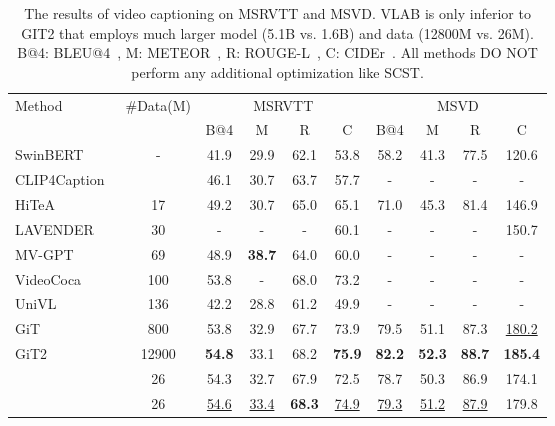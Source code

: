 \documentclass{article}
\begin{document}
\begin{table*}[]
\small
\centering
\caption{The results of video captioning on MSRVTT and MSVD. VLAB is only inferior to GIT2 that employs much larger model (5.1B vs. 1.6B) and data (12800M vs. 26M). B@4: BLEU@4~\cite{papineni2002bleu}, M: METEOR~\cite{banerjee2005meteor}, R: ROUGE-L~\cite{lin2004rouge}, C: CIDEr~\cite{vedantam2015cider}.  All methods DO NOT perform any additional optimization like SCST.}
\begin{tabular}{l|c|cccc|cccc}
\toprule
\multirow{2}{*}{Method} & \multirow{2}{*}{\#Data(M)}  & \multicolumn{4}{c|}{MSRVTT}     & \multicolumn{4}{c}{MSVD} \\ \cmidrule(lr){3-10} 
                                                          &                    & B@4 & M & R & C & B@4 & M & R & C         \\ 
    \midrule
    SwinBERT~\cite{lin2022swinbert} & -        &41.9   &29.9   &62.1   &53.8   &58.2 &41.3 &77.5 &120.6 \\
    CLIP4Caption~\cite{tang2021clip4caption}  & &46.1 &30.7   &63.7   &57.7   &-  &-  &-  &-  \\
    HiTeA~\cite{ye2022hitea}       &17       &49.2   &30.7   &65.0   &65.1   &71.0   &45.3   &81.4   &146.9\\
    LAVENDER~\cite{li2022lavender}  &30     &-   &- &-   & 60.1  &-  &-  &- &150.7 \\  
    MV-GPT~\cite{seo2022end}        &69      &48.9   &\textbf{38.7}   &64.0   &60.0   &-  &-  &-  &-\\
    VideoCoca~\cite{yan2022video}     &100   &53.8 &- &68.0 &73.2 &- &- &- &- \\
    UniVL~\cite{luo2020univl}       &136     &42.2   &28.8   &61.2   &49.9   &-  &-  &-  &-\\
    GiT~\cite{wang2022git}          &800   & 53.8 & 32.9 & 67.7 &73.9   &79.5   &51.1   &87.3   &\underline{180.2} \\
    GiT2~\cite{wang2022git}         &12900  & \textbf{54.8} &33.1 & 68.2 &\textbf{75.9}   &\textbf{82.2}   &\textbf{52.3}   &\textbf{88.7}   &\textbf{185.4}\\ 
    
    \midrule
           &26       &54.3   &32.7   &67.9   &72.5   &78.7   &50.3   &86.9   &174.1  \\
           &26       &\underline{54.6}   &\underline{33.4}   &\textbf{68.3}   &\underline{74.9}   &\underline{79.3}   &\underline{51.2}   &\underline{87.9}   &179.8   \\
    \bottomrule
\end{tabular}
\label{tab:results_cap}
\end{table*}
\end{document}

